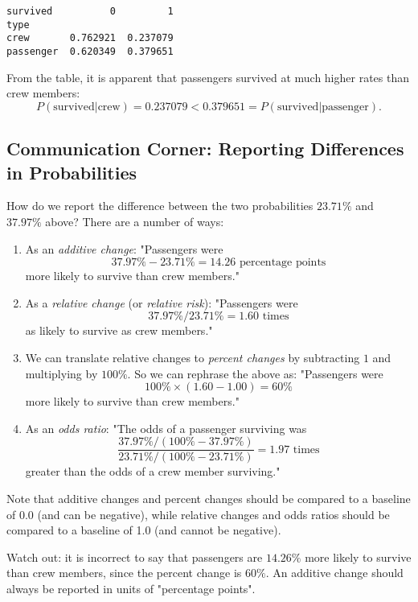 \small\begin{verbatim}
survived          0         1
type                         
crew       0.762921  0.237079
passenger  0.620349  0.379651
\end{verbatim}



From the table, it is apparent that passengers survived at much higher rates than crew members:
$$ P(\text{survived}|\text{crew}) = 0.237079 < 0.379651 = P(\text{survived}|\text{passenger}). $$



\subsection{Communication Corner: Reporting Differences in Probabilities}\label{2.3.1}



How do we report the difference between the two probabilities $23.71\%$ and $37.97\%$ above? There are a number of ways:
\begin{enumerate}
\item 
As an \textit{additive change}: "Passengers were
$$ 37.97\% - 23.71\% = 14.26 \text{ percentage points} $$
more likely to survive than crew members."

\item 
As a \textit{relative change} (or \textit{relative risk}): "Passengers were
$$ 37.97\% \big/ 23.71\% = 1.60 \text{ times} $$
as likely to survive as crew members."

\item 
We can translate relative changes to \textit{percent changes} by subtracting $1$ and multiplying by $100\%$. So we can rephrase the above as: "Passengers were
$$ 100\% \times (1.60 - 1.00) = 60\% $$
more likely to survive than crew members."

\item 
As an \textit{odds ratio}: "The odds of a passenger surviving was
$$ \frac{37.97\% \big/ (100\% - 37.97\%)}{23.71\% \big/ (100\% - 23.71\%)} = 1.97 \text{ times} $$
greater than the odds of a crew member surviving."

\end{enumerate}

Note that additive changes and percent changes should be compared to a baseline of 0.0 (and can be negative), while relative changes and odds ratios should be compared to a baseline of 1.0 (and cannot be negative).

Watch out: it is incorrect to say that passengers are $14.26\%$ more likely to survive than crew members, since the percent change is $60\%$. An additive change should always be reported in units of "percentage points".



